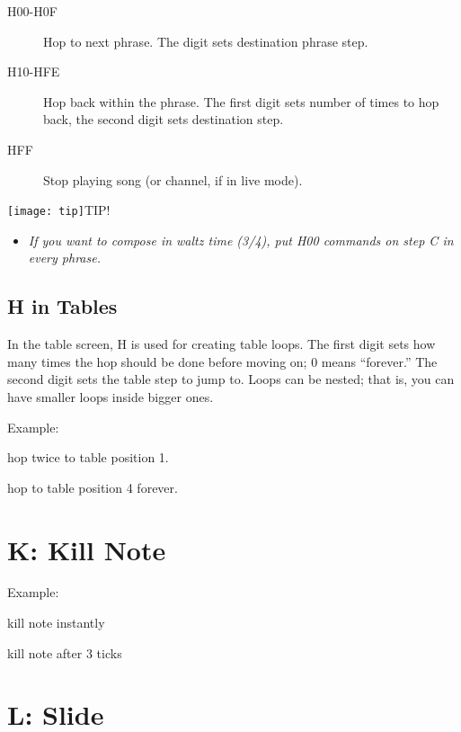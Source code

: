 \begin{description}
    \item[H00-H0F] Hop to next phrase. The digit sets destination phrase step.
    \item[H10-HFE] Hop back within the phrase. The first digit sets number of times to hop back, the second digit sets destination step.
    \item[HFF] Stop playing song (or channel, if in live mode).
\end{description}

\texttt{[image: tip]}TIP!
\nolinebreak
\begin{itemize}
        \item \textit{If you want to compose in waltz time (3/4), put \textsc{H00} commands on step \textsc{C} in every phrase.}
\end{itemize}


\subsection{H in Tables}

In the table screen, H is used for creating table loops. The first digit sets how many times the hop should be done before moving on; 0 means ``forever.'' The second digit sets the table step to jump to. Loops can be nested; that is, you can have smaller loops inside bigger ones.

\begin{description}
\item Example:
\item[H21] hop twice to table position 1.
\item[H04] hop to table position 4 forever.
\end{description}

\section{K: Kill Note}

\begin{description}
\item Example:
\item[K00] kill note instantly
\item[K03] kill note after 3 ticks
\end{description}

\section{L: Slide}

